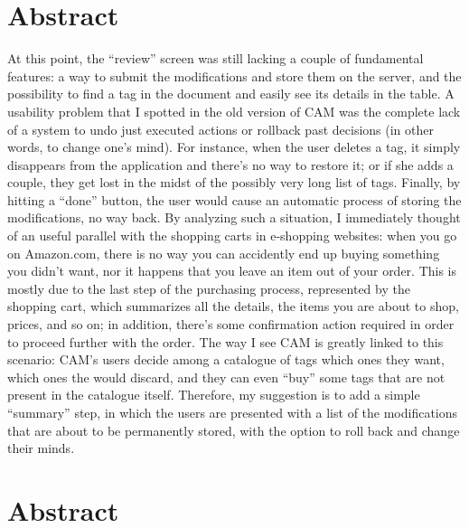 \documentclass[12pt,svgnames]{memoir}
\author{}
\date{}
\begin{document}

\addtocounter{page}{-1} %
\null
\thispagestyle{empty}%
\addtocounter{page}{-1}%
\newpage

{
\hypersetup{linkcolor=black}
\setcounter{tocdepth}{2}
\tableofcontents
}
\chapter*{Abstract}\label{abstract}

At this point, the ``review'' screen was still lacking a couple of
fundamental features: a way to submit the modifications and store them
on the server, and the possibility to find a tag in the document and
easily see its details in the table. A usability problem that I spotted
in the old version of CAM was the complete lack of a system to undo just
executed actions or rollback past decisions (in other words, to change
one's mind). For instance, when the user deletes a tag, it simply
disappears from the application and there's no way to restore it; or if
she adds a couple, they get lost in the midst of the possibly very long
list of tags. Finally, by hitting a ``done'' button, the user would
cause an automatic process of storing the modifications, no way back. By
analyzing such a situation, I immediately thought of an useful parallel
with the shopping carts in e-shopping websites: when you go on
Amazon.com, there is no way you can accidently end up buying something
you didn't want, nor it happens that you leave an item out of your
order. This is mostly due to the last step of the purchasing process,
represented by the shopping cart, which summarizes all the details, the
items you are about to shop, prices, and so on; in addition, there's
some confirmation action required in order to proceed further with the
order. The way I see CAM is greatly linked to this scenario: CAM's users
decide among a catalogue of tags which ones they want, which ones the
would discard, and they can even ``buy'' some tags that are not present
in the catalogue itself. Therefore, my suggestion is to add a simple
``summary'' step, in which the users are presented with a list of the
modifications that are about to be permanently stored, with the option
to roll back and change their minds.

\chapter*{Abstract}\label{abstract-1}
\end{document}
